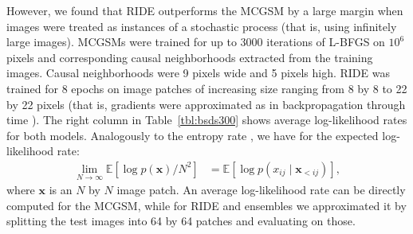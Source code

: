 \documentclass{article}
\begin{document}
		However, we found that RIDE outperforms the MCGSM by a large margin when images were treated
		as instances of a stochastic process (that is, using infinitely large images). MCGSMs were trained for up to 3000
		iterations of L-BFGS on $10^6$ pixels and corresponding causal neighborhoods extracted from the training images.
		Causal neighborhoods were 9 pixels wide and 5 pixels high. RIDE was trained
		for 8 epochs on image patches of increasing size ranging from 8 by 8 to 22 by 22 pixels
		(that is, gradients were approximated as in backpropagation through time \cite{Robinson:1987}). The right column in
		Table~\ref{tbl:bsds300} shows average log-likelihood rates for both models. Analogously to the entropy rate
		\cite{Cover:2006}, we have for the expected log-likelihood rate:
		\begin{align}
			\lim_{N \rightarrow \infty} \mathbb{E}\left[ \log p(\mathbf{x})/N^2 \right]
			&= \mathbb{E}[\log p(x_{ij} \mid \mathbf{x}_{<ij})],
		\end{align}
		where $\mathbf{x}$ is an $N$ by $N$ image patch. An average log-likelihood rate can be directly
		computed for the MCGSM, while for RIDE and ensembles we approximated it by splitting the test images into
		64 by 64 patches and evaluating on those.
\end{document}
